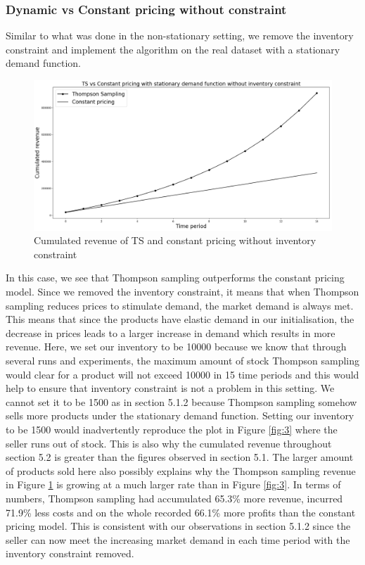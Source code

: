 \documentclass[a4paper]{article}
\begin{document}
\subsubsection{Dynamic vs Constant pricing without constraint}
Similar to what was done in the non-stationary setting, we remove the inventory constraint and implement the algorithm on the real dataset with a stationary demand function.
\begin{figure}[h]
	\centering
	\includegraphics[width=1.03\textwidth]{522.png}
	\caption{\label{fig:1}Cumulated revenue of TS and constant pricing without inventory constraint}
\end{figure}
\newline
In this case, we see that Thompson sampling outperforms the constant pricing model. Since we removed the inventory constraint, it means that when Thompson sampling reduces prices to stimulate demand, the market demand is always met. This means that since the products have elastic demand in our initialisation, the decrease in prices leads to a larger increase in demand which results in more revenue.
\newline
\newline
Here, we set our inventory to be 10000 because we know that through several runs and experiments, the maximum amount of stock Thompson sampling would clear for a product will not exceed 10000 in 15 time periods and this would help to ensure that inventory constraint is not a problem in this setting. We cannot set it to be 1500 as in section 5.1.2 because Thompson sampling somehow sells more products under the stationary demand function. Setting our inventory to be 1500 would inadvertently reproduce the plot in Figure \ref{fig:3} where the seller runs out of stock. This is also why the cumulated revenue throughout section 5.2 is greater than the figures observed in section 5.1. The larger amount of products sold here also possibly explains why the Thompson sampling revenue in Figure \ref{fig:1} is growing at a much larger rate than in Figure \ref{fig:3}.
\newline
\newline
In terms of numbers, Thompson sampling had accumulated 65.3\% more revenue, incurred 71.9\% less costs and on the whole recorded 66.1\% more profits than the constant pricing model. This is consistent with our observations in section 5.1.2 since the seller can now meet the increasing market demand in each time period with the inventory constraint removed.
\end{document}
